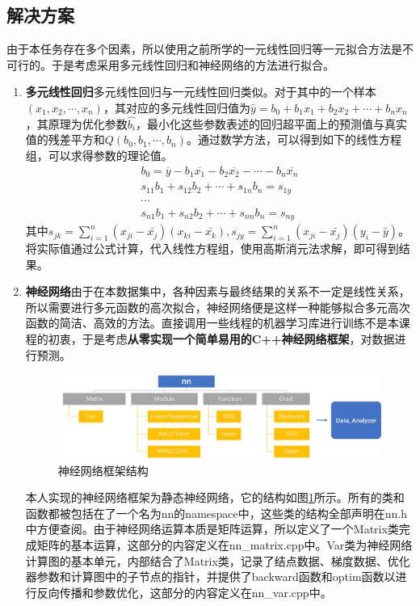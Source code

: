 \documentclass[CJK]{ctexart}
\begin{document}
\subsection{解决方案}
由于本任务存在多个因素，所以使用之前所学的一元线性回归等一元拟合方法是不可行的。于是考虑采用多元线性回归和神经网络的方法进行拟合。
\begin{enumerate}[(1)]
    \item \textbf{多元线性回归}\quad 多元线性回归与一元线性回归类似。对于其中的一个样本 $(x_1,x_2,\cdots,x_n)$，其对应的多元线性回归值为$\hat{y}=b_0+b_1x_1+b_2x_2+\cdots+b_nx_n$，其原理为优化参数$ \hat{b_i} $，最小化这些参数表述的回归超平面上的预测值与真实值的残差平方和$Q(b_0,b_1,\cdots,b_n)$。通过数学方法，可以得到如下的线性方程组，可以求得参数的理论值。
    \begin{gather*}
    b_0=\overline{y}-b_1\overline{x_1}-b_2\overline{x_2}-\cdots-b_n\overline{x_n}\\
    s_{11}b_1+s_{12}b_2+\cdots+s_{1n}b_n=s_{1y}\\
    \cdots\\
    s_{n1}b_1+s_{n2}b_2+\cdots+s_{nn}b_n=s_{ny}
    \end{gather*}
    其中$s_{jk}=\sum\limits_{i=1}^n(x_{ji}-\bar{x_j})(x_{ki}-\bar{x_k}),s_{jy}=\sum\limits_{i=1}^n(x_{ji}-\bar{x_j})(y_i-\bar{y})$。将实际值通过公式计算，代入线性方程组，使用高斯消元法求解，即可得到结果。
    \item \textbf{神经网络}\quad 由于在本数据集中，各种因素与最终结果的关系不一定是线性关系，所以需要进行多元函数的高次拟合，神经网络便是这样一种能够拟合多元高次函数的简洁、高效的方法。直接调用一些线程的机器学习库进行训练不是本课程的初衷，于是考虑\textbf{从零实现一个简单易用的C++神经网络框架}，对数据进行预测。\par
    \begin{figure}[htbp]
        \centering
        \includegraphics[width=6in]{img/struct_2.jpg}
        \caption{神经网络框架结构}
        \label{fig:struct_nn}
    \end{figure}
    \qquad 本人实现的神经网络框架为静态神经网络，它的结构如图\ref{fig:struct_nn}所示。所有的类和函数都被包括在了一个名为nn的namespace中，这些类的结构全部声明在nn.h中方便查阅。由于神经网络运算本质是矩阵运算，所以定义了一个Matrix类完成矩阵的基本运算，这部分的内容定义在nn\_matrix.cpp中。Var类为神经网络计算图的基本单元，内部结合了Matrix类，记录了结点数据、梯度数据、优化器参数和计算图中的子节点的指针，并提供了backward函数和optim函数以进行反向传播和参数优化，这部分的内容定义在nn\_var.cpp中。\par

\end{enumerate}
\end{document}
